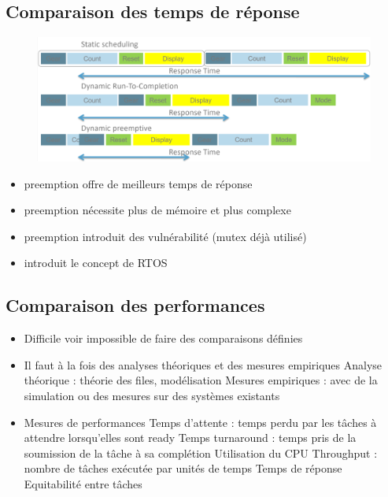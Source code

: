 \documentclass[resume]{subfiles}
\begin{document}
\subsection{Comparaison des temps de réponse}
\begin{figure}[H]
    \centering
    \includegraphics[width=1\columnwidth]{Figures/scheduling/tempsReponse.png}
\end{figure}

\begin{itemize}
\item preemption offre de meilleurs temps de réponse
\item preemption nécessite plus de mémoire et plus complexe
\item preemption introduit des vulnérabilité (mutex déjà utilisé)
\item introduit le concept de RTOS
\end{itemize}

\subsection{Comparaison des performances}
\begin{itemize}


\item Difficile voir impossible de faire des comparaisons définies

\item Il faut à la fois des analyses théoriques et des mesures empiriques
\subitem Analyse théorique : théorie des files, modélisation
\subitem Mesures empiriques : avec de la simulation ou des mesures sur des systèmes existants

\item Mesures de performances
\subitem Temps d'attente : temps perdu par les tâches à attendre lorsqu'elles sont ready
\subitem Temps turnaround : temps pris de la soumission de la tâche à sa complétion
\subitem Utilisation du CPU
\subitem Throughput : nombre de tâches exécutée par unités de temps
\subitem Temps de réponse
\subitem Equitabilité entre tâches

\end{itemize}
\end{document}
